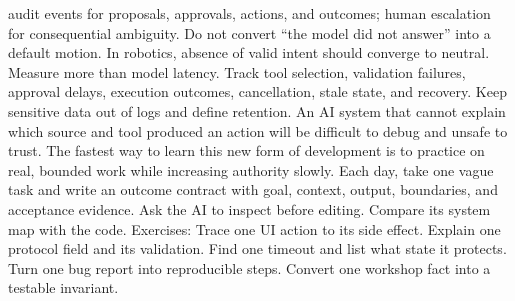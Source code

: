 \markdownRendererUlItem audit events for proposals, approvals, actions, and outcomes;\markdownRendererUlItemEnd 
\markdownRendererUlItem human escalation for consequential ambiguity.\markdownRendererUlItemEnd 
\markdownRendererUlEnd \markdownRendererInterblockSeparator
{}Do not convert “the model did not answer” into a default motion. In robotics,\markdownRendererSoftLineBreak
{}absence of valid intent should converge to neutral.\markdownRendererInterblockSeparator
{}
\markdownRendererSectionEnd \markdownRendererSectionBegin
{}\markdownRendererInterblockSeparator
{}Measure more than model latency. Track tool selection, validation failures,\markdownRendererSoftLineBreak
{}approval delays, execution outcomes, cancellation, stale state, and recovery.\markdownRendererSoftLineBreak
{}Keep sensitive data out of logs and define retention. An AI system that cannot\markdownRendererSoftLineBreak
{}explain which source and tool produced an action will be difficult to debug and\markdownRendererSoftLineBreak
{}unsafe to trust.\markdownRendererInterblockSeparator
{}\markdownRendererThematicBreak{}\markdownRendererInterblockSeparator
{}
\markdownRendererSectionEnd 
\markdownRendererSectionEnd \markdownRendererSectionBegin
{}\markdownRendererInterblockSeparator
{}The fastest way to learn this new form of development is to practice on real,\markdownRendererSoftLineBreak
{}bounded work while increasing authority slowly.\markdownRendererInterblockSeparator
{}\markdownRendererSectionBegin
{}\markdownRendererInterblockSeparator
{}Each day, take one vague task and write an outcome contract with goal, context,\markdownRendererSoftLineBreak
{}output, boundaries, and acceptance evidence. Ask the AI to inspect before\markdownRendererSoftLineBreak
{}editing. Compare its system map with the code.\markdownRendererParagraphSeparator
{}Exercises:\markdownRendererInterblockSeparator
{}\markdownRendererOlBegin
{}Trace one UI action to its side effect.\markdownRendererOlItemEnd 
{}Explain one protocol field and its validation.\markdownRendererOlItemEnd 
{}Find one timeout and list what state it protects.\markdownRendererOlItemEnd 
{}Turn one bug report into reproducible steps.\markdownRendererOlItemEnd 
{}Convert one workshop fact into a testable invariant.\markdownRendererOlItemEnd 
